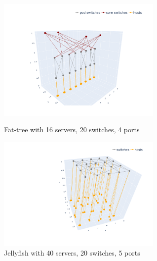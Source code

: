 \documentclass[a4paper,11pt]{article}
\begin{document}
    \begin{figure}[htbp]
    \centering
    \begin{minipage}[t]{0.48\textwidth}
    \centering
    \includegraphics[width=8cm]{fattree_k4.png}
    \caption{Fat-tree with 16 servers, 20 switches, 4 ports}
    \end{minipage}
    \begin{minipage}[t]{0.48\textwidth}
    \centering
    \includegraphics[width=8cm]{jellyfish_k4.png}
    \caption{Jellyfish with 40 servers, 20 switches, 5 ports}
    \end{minipage}
    \end{figure}
\end{document}
